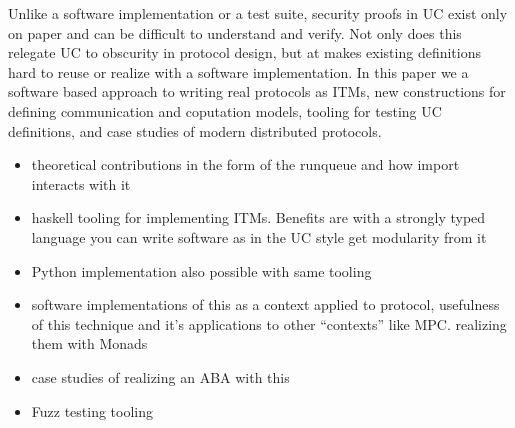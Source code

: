 
Unlike a software implementation or a test suite, security proofs in UC exist only on paper and can be difficult to understand and verify.
Not only does this relegate UC to obscurity in protocol design, but at makes existing definitions hard to reuse or realize with a software implementation.
In this paper we a software based approach to writing real protocols as ITMs, new constructions for defining communication and coputation models, tooling for testing UC definitions, and case studies of modern distributed protocols.

\begin{itemize}
\item theoretical contributions in the form of the runqueue and how import interacts with it
\item haskell tooling for implementing ITMs. Benefits are with a strongly typed language you can write software as in the UC style get modularity from it
\item Python implementation also possible with same tooling
\item software implementations of this as a context applied to protocol, usefulness of this technique and it's applications to other ``contexts'' like MPC. realizing them with Monads 
\item case studies of realizing an ABA with this 
\item Fuzz testing tooling 
\end{itemize}
